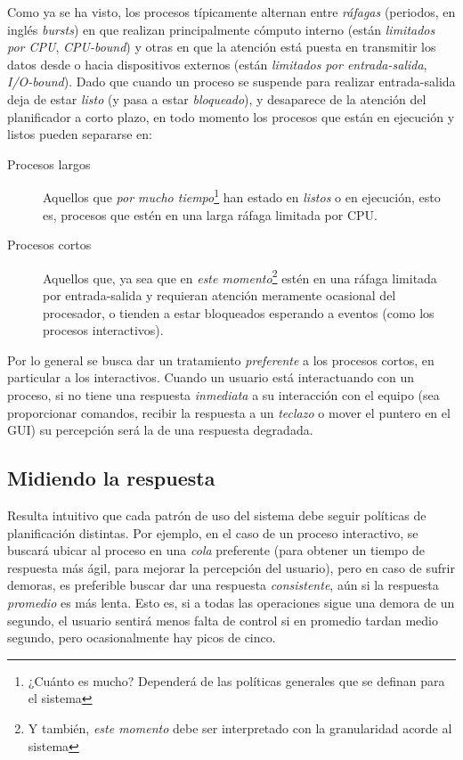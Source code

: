 \documentclass[11pt,fleqn]{book} %
\begin{document}
Como ya se ha visto, los procesos típicamente alternan entre \emph{ráfagas}
(periodos, en inglés \emph{bursts}) en que realizan principalmente cómputo
interno (están \emph{limitados por CPU}, \emph{CPU-bound}) y otras en que la
atención está puesta en transmitir los datos desde o hacia
dispositivos externos (están \emph{limitados por entrada-salida},
\emph{I/O-bound}). Dado que cuando un proceso se suspende para realizar
entrada-salida deja de estar \emph{listo} (y pasa a estar \emph{bloqueado}), y
desaparece de la atención del planificador a corto plazo, en todo
momento los procesos que están en ejecución y listos pueden separarse
en:

\begin{description}
\item[Procesos largos] Aquellos que \emph{por mucho tiempo}\footnote{¿Cuánto es
     mucho? Dependerá de las políticas generales que se definan para el
     sistema } han estado en \emph{listos} o en ejecución, esto es,
     procesos que estén en una larga ráfaga limitada por CPU.
\item[Procesos cortos] Aquellos que, ya sea que en \emph{este momento}\footnote{Y
     también, \emph{este momento} debe ser interpretado con la granularidad
     acorde al sistema } estén en una ráfaga limitada por
     entrada-salida y requieran atención meramente ocasional del
     procesador, o tienden a estar bloqueados esperando a eventos
     (como los procesos interactivos).
\end{description}

Por lo general se busca dar un tratamiento \emph{preferente} a los procesos
cortos, en particular a los interactivos. Cuando un usuario está
interactuando con un proceso, si no tiene una respuesta \emph{inmediata} a
su interacción con el equipo (sea proporcionar comandos, recibir la
respuesta a un \emph{teclazo} o mover el puntero en el GUI) su percepción
será la de una respuesta degradada.
\subsection{Midiendo la respuesta}
\label{sec-4-1-2}


Resulta intuitivo que cada patrón de uso del sistema debe seguir
políticas de planificación distintas. Por ejemplo, en el caso de un
proceso interactivo, se buscará ubicar al proceso en una \emph{cola}
preferente (para obtener un tiempo de respuesta más ágil, para mejorar
la percepción del usuario), pero en caso de sufrir demoras, es
preferible buscar dar una respuesta \emph{consistente}, aún si la respuesta
\emph{promedio} es más lenta. Esto es, si a todas las operaciones sigue una
demora de un segundo, el usuario sentirá menos falta de control si en
promedio tardan medio segundo, pero ocasionalmente hay picos de cinco.
\end{document}
